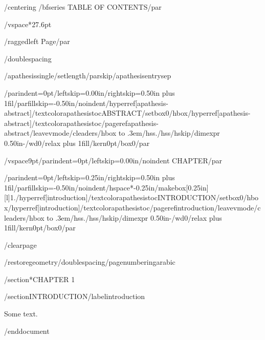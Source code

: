 {/centering
/bfseries TABLE OF CONTENTS/par}

/vspace*{27.6pt}

{/raggedleft
Page/par}

/doublespacing

{/apathesissingle/setlength{/parskip}{/apathesisentrysep}

{/parindent=0pt/leftskip=0.00in/rightskip=0.50in plus 1fil/parfillskip=-0.50in/noindent/hyperref[apathesis-abstract]{/textcolor{apathesistoc}{ABSTRACT}}/setbox0/hbox{/hyperref[apathesis-abstract]{/textcolor{apathesistoc}{/pageref{apathesis-abstract}}}}/leavevmode/cleaders/hbox to .3em{/hss./hss}/hskip/dimexpr 0.50in-/wd0/relax plus 1fill/kern0pt/box0/par}

/vspace{9pt}{/parindent=0pt/leftskip=0.00in/noindent CHAPTER/par}

{/parindent=0pt/leftskip=0.25in/rightskip=0.50in plus 1fil/parfillskip=-0.50in/noindent/hspace*{-0.25in}/makebox[0.25in][l]{1.}/hyperref[introduction]{/textcolor{apathesistoc}{INTRODUCTION}}/setbox0/hbox{/hyperref[introduction]{/textcolor{apathesistoc}{/pageref{introduction}}}}/leavevmode/cleaders/hbox to .3em{/hss./hss}/hskip/dimexpr 0.50in-/wd0/relax plus 1fill/kern0pt/box0/par}

}

/clearpage

/restoregeometry/doublespacing/pagenumbering{arabic}

/section*{CHAPTER 1}

/section{INTRODUCTION}/label{introduction}

Some text.




/end{document}
